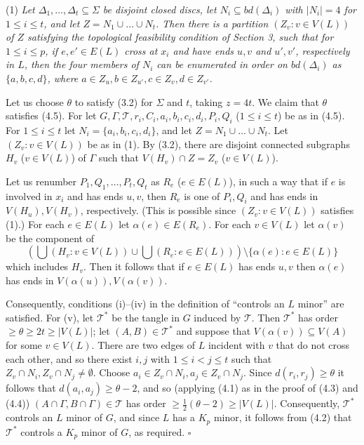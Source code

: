 \hspace*{12pt}(1) \textit{Let $\Delta_1, \dots, \Delta_t \subseteq \Sigma$ be disjoint closed discs, let $N_i \subseteq bd(\Delta_i)$ with $|N_i| = 4$ for $1 \le i \le t$, and let $Z = N_1 \cup \dots \cup N_t$. Then there is a partition $(Z_v \colon v \in V(L))$ of $Z$ satisfying the topological feasibility condition of Section 3, such that for $1 \le i \le p$, if $e, e' \in E(L)$ cross at $x_i$ and have ends $u, v$ and $u', v'$, respectively in $L$, then the four members of $N_i$ can be enumerated in order on $bd(\Delta_i)$ as $\{a, b, c, d\}$, where $a \in Z_u, b \in Z_{u'}, c \in Z_v, d \in Z_{v'}$.}

Let us choose $\theta$ to satisfy (3.2) for $\Sigma$ and $t$, taking $z = 4t$. We claim that $\theta$ satisfies (4.5). For let $G, \Gamma, \mathscr{T}, r_i, C_i, a_i, b_i, c_i, d_i, P_i, Q_i$ ($1 \le i \le t$) be as in (4.5). For $1 \le i \le t$ let $N_i = \{a_i, b_i, c_i, d_i\}$, and let $Z = N_1 \cup \dots \cup N_t$. Let $(Z_v \colon v \in V(L))$ be as in (1). By (3.2), there are disjoint connected subgraphs $H_v$ ($v \in V(L)$) of $\Gamma$ such that $V(H_v) \cap Z = Z_v$ ($v \in V(L)$).

Let us renumber $P_1, Q_1, \dots, P_t, Q_t$ as $R_e$ ($e \in E(L)$), in such a way that if $e$ is involved in $x_i$ and has ends $u, v$, then $R_e$ is one of $P_i, Q_i$ and has ends in $V(H_u), V(H_v)$, respectively. (This is possible since $(Z_v \colon v \in V(L))$ satisfies (1).) For each $e \in E(L)$ let $\alpha(e) \in E(R_e)$. For each $v \in V(L)$ let $\alpha(v)$ be the component of
\begin{equation*}
(\bigcup (H_v \colon v \in V(L)) \cup \bigcup (R_e \colon e \in E(L))) \setminus \{\alpha(e) \colon e \in E(L)\}
\end{equation*}
which includes $H_v$. Then it follows that if $e \in E(L)$ has ends $u, v$ then $\alpha(e)$ has ends in $V(\alpha(u)), V(\alpha(v))$.

Consequently, conditions (i)--(iv) in the definition of ``controls an $L$ minor'' are satisfied. For (v), let $\mathscr{T}^*$ be the tangle in $G$ induced by $\mathscr{T}$. Then $\mathscr{T}^*$ has order $\ge \theta \ge 2t \ge |V(L)|$; let $(A, B) \in \mathscr{T}^*$ and suppose that $V(\alpha(v)) \subseteq V(A)$ for some $v \in V(L)$. There are two edges of $L$ incident with $v$ that do not cross each other, and so there exist $i, j$ with $1 \le i < j \le t$ such that $Z_v \cap N_i, Z_v \cap N_j \ne \emptyset$. Choose $a_i \in Z_v \cap N_i, a_j \in Z_v \cap N_j$. Since $d(r_i, r_j) \ge \theta$ it follows that $d(a_i, a_j) \ge \theta - 2$, and so (applying (4.1) as in the proof of (4.3) and (4.4)) $(A \cap \Gamma, B \cap \Gamma) \in \mathscr{T}$ has order $\ge \frac{1}{2}(\theta - 2) \ge |V(L)|$. Consequently, $\mathscr{T}^*$ controls an $L$ minor of $G$, and since $L$ has a $K_p$ minor, it follows from (4.2) that $\mathscr{T}^*$ controls a $K_p$ minor of $G$, as required. $\square$

